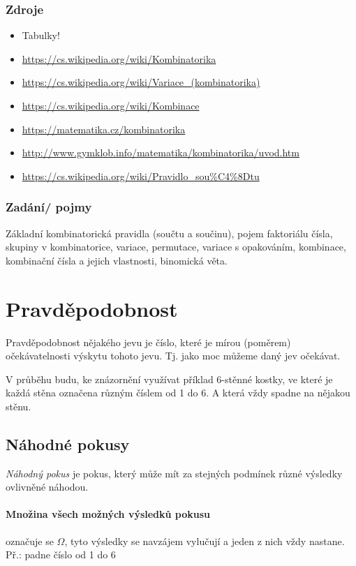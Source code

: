\documentclass[12pt]{article}
\begin{document}
\subsubsection{Zdroje}
\begin{itemize}
\item Tabulky!
\item \url{https://cs.wikipedia.org/wiki/Kombinatorika}
\item \url{https://cs.wikipedia.org/wiki/Variace_(kombinatorika)}
\item \url{https://cs.wikipedia.org/wiki/Kombinace}
\item \url{https://matematika.cz/kombinatorika}
\item \url{http://www.gymklob.info/matematika/kombinatorika/uvod.htm}
\item \url{https://cs.wikipedia.org/wiki/Pravidlo_sou\%C4\%8Dtu}
\end{itemize}
\subsubsection{Zadání/ pojmy}
Základní kombinatorická pravidla (součtu a součinu), pojem faktoriálu čísla, skupiny v kombinatorice, variace, permutace, variace s opakováním, kombinace, kombinační čísla a jejich vlastnosti, binomická věta.
\section{Pravděpodobnost}
Pravděpodobnost nějakého jevu je číslo, které je mírou (poměrem) očekávatelnosti výskytu tohoto jevu. Tj. jako moc můžeme daný jev očekávat.
\begin{scriptsize}
V průběhu budu, ke znázornění využívat příklad 6-stěnné kostky, ve které je každá stěna označena různým číslem od 1 do 6. A která vždy spadne na nějakou stěnu.
\end{scriptsize}
\subsection{Náhodné pokusy}
\emph{Náhodný pokus} je pokus, který může mít za stejných podmínek různé výsledky ovlivněné náhodou.\\
\paragraph{Množina všech možných výsledků pokusu} označuje se $\Omega$, tyto výsledky se navzájem vylučují a jeden z nich vždy nastane. Př.: padne číslo od 1 do 6
\end{document}
